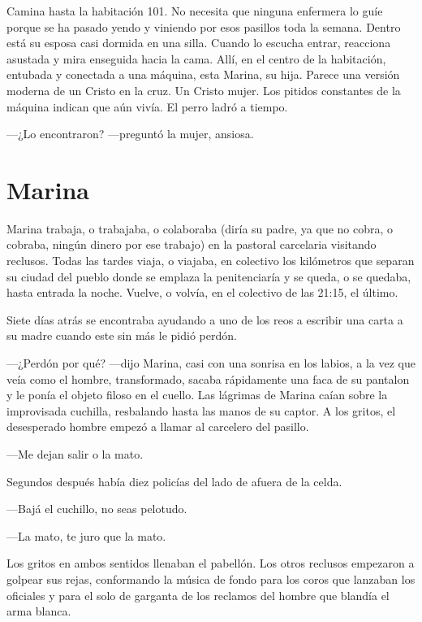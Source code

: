 Camina hasta la habitación 101. No necesita que ninguna enfermera lo guíe porque se ha pasado yendo y viniendo por esos pasillos toda la semana. Dentro está su esposa casi dormida en una silla. Cuando lo escucha entrar, reacciona asustada y mira enseguida hacia la cama. Allí, en el centro de la habitación, entubada y conectada a una máquina, esta Marina, su hija. Parece una versión moderna de un Cristo en la cruz. Un Cristo mujer. Los pitidos constantes de la máquina indican que aún vivía. El perro ladró a tiempo. 

---¿Lo encontraron? ---preguntó la mujer, ansiosa.

\chapter*{Marina}

Marina trabaja, o trabajaba, o colaboraba (diría su padre, ya que no cobra, o cobraba, ningún dinero por ese trabajo) en la pastoral carcelaria visitando reclusos. Todas las tardes viaja, o viajaba, en colectivo los kilómetros que separan su ciudad del pueblo donde 
se emplaza la penitenciaría y se queda, o se quedaba, hasta entrada la noche. Vuelve, o volvía, en el colectivo de las 21:15, el último.

Siete días atrás se encontraba ayudando a uno de los reos a escribir una carta a su madre cuando este sin más le pidió perdón. 

---¿Perdón por qué? ---dijo Marina, casi con una sonrisa en los labios, a la vez que veía como el hombre, transformado, sacaba rápidamente una faca de su pantalon y le ponía el objeto filoso en el cuello. Las lágrimas de Marina caían sobre la improvisada cuchilla, resbalando hasta las manos de su captor. A los gritos, el desesperado hombre empezó a llamar al carcelero del pasillo. 

---Me dejan salir o la mato.

Segundos después había diez policías del lado de afuera de la celda. 

---Bajá el cuchillo, no seas pelotudo.

---La mato, te juro que la mato.

Los gritos en ambos sentidos llenaban el pabellón. Los otros reclusos empezaron a golpear sus rejas, conformando la música de fondo para los coros que lanzaban los oficiales y para el solo de garganta de los reclamos del hombre que blandía el arma blanca.

